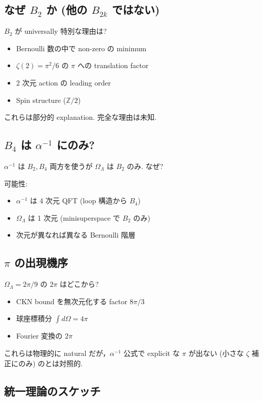 \documentclass[11pt,a4paper]{article}
\begin{document}
\subsection{なぜ $B_2$ か (他の $B_{2k}$ ではない)}

$B_2$ が universally 特別な理由は?

\begin{itemize}
\item Bernoulli 数の中で non-zero の minimum
\item $\zeta(2) = \pi^2/6$ の $\pi$ への translation factor
\item 2 次元 action の leading order
\item Spin structure ($\mathbb{Z}/2$)
\end{itemize}

これらは部分的 explanation. 完全な理由は未知.

\subsection{$B_4$ は $\alpha^{-1}$ にのみ?}

$\alpha^{-1}$ は $B_2, B_4$ 両方を使うが $\Omega_\Lambda$ は $B_2$ のみ.
なぜ?

可能性:
\begin{itemize}
\item $\alpha^{-1}$ は 4 次元 QFT (loop 構造から $B_4$)
\item $\Omega_\Lambda$ は 1 次元 (minisuperspace で $B_2$ のみ)
\item 次元が異なれば異なる Bernoulli 階層
\end{itemize}

\subsection{$\pi$ の出現機序}

$\Omega_\Lambda = 2\pi/9$ の $2\pi$ はどこから?
\begin{itemize}
\item CKN bound を無次元化する factor $8\pi/3$
\item 球座標積分 $\int d\Omega = 4\pi$
\item Fourier 変換の $2\pi$
\end{itemize}

これらは物理的に natural だが，$\alpha^{-1}$ 公式で explicit な $\pi$
が出ない (小さな $\zeta$ 補正にのみ) のとは対照的.

\subsection{統一理論のスケッチ}
\end{document}
